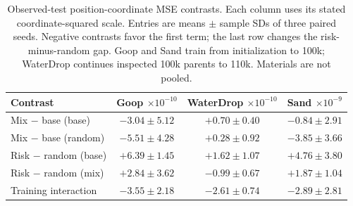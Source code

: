 \begin{table}[t]
\centering\scriptsize
\caption{Observed-test position-coordinate MSE contrasts. Each column uses its stated coordinate-squared scale. Entries are means $\pm$ sample SDs of three paired seeds. Negative contrasts favor the first term; the last row changes the risk-minus-random gap. Goop and Sand train from initialization to 100k; WaterDrop continues inspected 100k parents to 110k. Materials are not pooled.}
\label{tab:goop-exposure-placement}
\setlength{\tabcolsep}{2pt}
\begin{tabular}{lccc}
\toprule
Contrast & \shortstack{Goop\\$\times10^{-10}$} & \shortstack{WaterDrop\\$\times10^{-10}$} & \shortstack{Sand\\$\times10^{-9}$}\\
\midrule
Mix $-$ base (base) & $-3.04\pm5.12$ & $+0.70\pm0.40$ & $-0.84\pm2.91$\\
Mix $-$ base (random) & $-5.51\pm4.28$ & $+0.28\pm0.92$ & $-3.85\pm3.66$\\
Risk $-$ random (base) & $+6.39\pm1.45$ & $+1.62\pm1.07$ & $+4.76\pm3.80$\\
Risk $-$ random (mix) & $+2.84\pm3.62$ & $-0.99\pm0.67$ & $+1.87\pm1.04$\\
Training interaction & $-3.55\pm2.18$ & $-2.61\pm0.74$ & $-2.89\pm2.81$\\
\bottomrule
\end{tabular}
\end{table}
